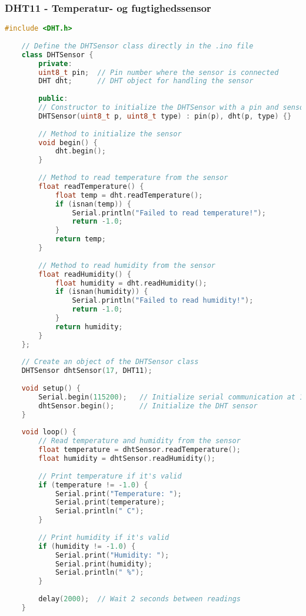\subsubsection*{DHT11 - Temperatur- og fugtighedssensor}
\begin{lstlisting}[language=C++]
	#include <DHT.h>
	
	// Define the DHTSensor class directly in the .ino file
	class DHTSensor {
		private:
		uint8_t pin;  // Pin number where the sensor is connected
		DHT dht;      // DHT object for handling the sensor
		
		public:
		// Constructor to initialize the DHTSensor with a pin and sensor type (DHT11/DHT22)
		DHTSensor(uint8_t p, uint8_t type) : pin(p), dht(p, type) {}
		
		// Method to initialize the sensor
		void begin() {
			dht.begin();
		}
		
		// Method to read temperature from the sensor
		float readTemperature() {
			float temp = dht.readTemperature();
			if (isnan(temp)) {
				Serial.println("Failed to read temperature!");
				return -1.0;
			}
			return temp;
		}
		
		// Method to read humidity from the sensor
		float readHumidity() {
			float humidity = dht.readHumidity();
			if (isnan(humidity)) {
				Serial.println("Failed to read humidity!");
				return -1.0;
			}
			return humidity;
		}
	};
	
	// Create an object of the DHTSensor class
	DHTSensor dhtSensor(17, DHT11);
	
	void setup() {
		Serial.begin(115200);   // Initialize serial communication at 115200 baud rate
		dhtSensor.begin();      // Initialize the DHT sensor
	}
	
	void loop() {
		// Read temperature and humidity from the sensor
		float temperature = dhtSensor.readTemperature();
		float humidity = dhtSensor.readHumidity();
		
		// Print temperature if it's valid
		if (temperature != -1.0) {
			Serial.print("Temperature: ");
			Serial.print(temperature);
			Serial.println(" C");
		}
		
		// Print humidity if it's valid
		if (humidity != -1.0) {
			Serial.print("Humidity: ");
			Serial.print(humidity);
			Serial.println(" %");
		}
		
		delay(2000);  // Wait 2 seconds between readings
	}
\end{lstlisting}
\clearpage

